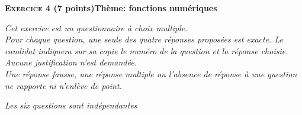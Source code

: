\documentclass[11pt,a4paper,french]{article}
\begin{document}
\bigskip

\textbf{\textsc{Exercice 4} (7 points)\hfill Thème: fonctions numériques}

\medskip

\emph{Cet exercice est un questionnaire à choix multiple.\\
Pour chaque question, une seule des quatre réponses proposées est exacte. Le candidat indiquera sur sa copie le numéro de la question et la réponse choisie. \\
Aucune justification n'est demandée.\\
Une réponse fausse, une réponse multiple ou l'absence de réponse à une question ne rapporte ni n'enlève de point.}

\emph{Les six questions sont indépendantes}

\medskip
\end{document}
